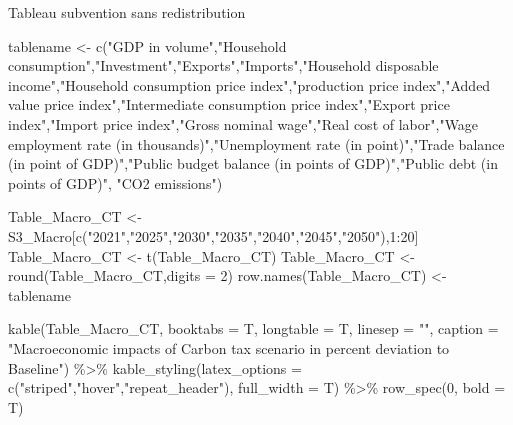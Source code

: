 \documentclass[
]{article}
\newenvironment{Shaded}{\begin{snugshade}}{\end{snugshade}}
\newcommand{\AttributeTok}[1]{\textcolor[rgb]{0.77,0.63,0.00}{#1}}
\newcommand{\DecValTok}[1]{\textcolor[rgb]{0.00,0.00,0.81}{#1}}
\newcommand{\FunctionTok}[1]{\textcolor[rgb]{0.00,0.00,0.00}{#1}}
\newcommand{\NormalTok}[1]{#1}
\newcommand{\OtherTok}[1]{\textcolor[rgb]{0.56,0.35,0.01}{#1}}
\newcommand{\SpecialCharTok}[1]{\textcolor[rgb]{0.00,0.00,0.00}{#1}}
\newcommand{\StringTok}[1]{\textcolor[rgb]{0.31,0.60,0.02}{#1}}
\begin{document}
Tableau subvention sans redistribution

\begin{Shaded}
\begin{Highlighting}[]
\NormalTok{tablename }\OtherTok{\textless{}{-}} \FunctionTok{c}\NormalTok{(}\StringTok{"GDP in volume"}\NormalTok{,}\StringTok{"Household consumption"}\NormalTok{,}\StringTok{"Investment"}\NormalTok{,}\StringTok{"Exports"}\NormalTok{,}\StringTok{"Imports"}\NormalTok{,}\StringTok{"Household disposable income"}\NormalTok{,}\StringTok{"Household consumption price index"}\NormalTok{,}\StringTok{"production price index"}\NormalTok{,}\StringTok{"Added value price index"}\NormalTok{,}\StringTok{"Intermediate consumption price index"}\NormalTok{,}\StringTok{"Export price index"}\NormalTok{,}\StringTok{"Import price index"}\NormalTok{,}\StringTok{"Gross nominal wage"}\NormalTok{,}\StringTok{"Real cost of labor"}\NormalTok{,}\StringTok{"Wage employment rate (in thousands)"}\NormalTok{,}\StringTok{"Unemployment rate (in point)"}\NormalTok{,}\StringTok{"Trade balance (in point of GDP)"}\NormalTok{,}\StringTok{"Public budget balance (in points of GDP)"}\NormalTok{,}\StringTok{"Public debt (in points of GDP)"}\NormalTok{, }\StringTok{"CO2 emissions"}\NormalTok{)}

\NormalTok{Table\_Macro\_CT }\OtherTok{\textless{}{-}}\NormalTok{ S3\_Macro[}\FunctionTok{c}\NormalTok{(}\StringTok{"2021"}\NormalTok{,}\StringTok{"2025"}\NormalTok{,}\StringTok{"2030"}\NormalTok{,}\StringTok{"2035"}\NormalTok{,}\StringTok{"2040"}\NormalTok{,}\StringTok{"2045"}\NormalTok{,}\StringTok{"2050"}\NormalTok{),}\DecValTok{1}\SpecialCharTok{:}\DecValTok{20}\NormalTok{]}
\NormalTok{Table\_Macro\_CT }\OtherTok{\textless{}{-}} \FunctionTok{t}\NormalTok{(Table\_Macro\_CT)}
\NormalTok{Table\_Macro\_CT }\OtherTok{\textless{}{-}} \FunctionTok{round}\NormalTok{(Table\_Macro\_CT,}\AttributeTok{digits =} \DecValTok{2}\NormalTok{)}
\FunctionTok{row.names}\NormalTok{(Table\_Macro\_CT) }\OtherTok{\textless{}{-}}\NormalTok{ tablename}

\FunctionTok{kable}\NormalTok{(Table\_Macro\_CT, }\AttributeTok{booktabs =}\NormalTok{ T, }\AttributeTok{longtable =}\NormalTok{ T, }\AttributeTok{linesep =} \StringTok{""}\NormalTok{, }\AttributeTok{caption =} \StringTok{"Macroeconomic impacts of Carbon tax scenario in percent deviation to Baseline"}\NormalTok{) }\SpecialCharTok{\%\textgreater{}\%} 
\FunctionTok{kable\_styling}\NormalTok{(}\AttributeTok{latex\_options =} \FunctionTok{c}\NormalTok{(}\StringTok{"striped"}\NormalTok{,}\StringTok{"hover"}\NormalTok{,}\StringTok{"repeat\_header"}\NormalTok{), }\AttributeTok{full\_width =}\NormalTok{ T) }\SpecialCharTok{\%\textgreater{}\%} 
\FunctionTok{row\_spec}\NormalTok{(}\DecValTok{0}\NormalTok{, }\AttributeTok{bold =}\NormalTok{ T)}
\end{Highlighting}
\end{Shaded}
\end{document}
